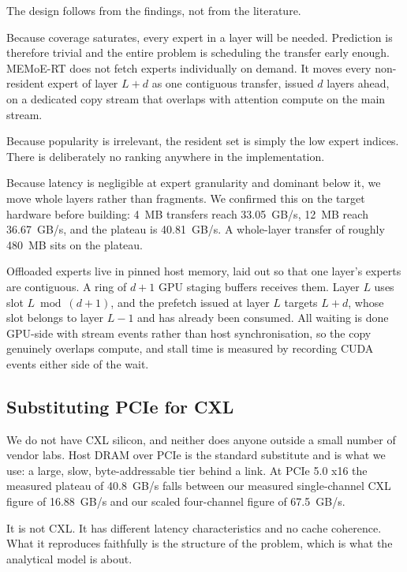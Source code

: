 \documentclass[10pt,a4paper]{article}
\begin{document}
The design follows from the findings, not from the literature.

Because coverage saturates, every expert in a layer will be needed. Prediction is
therefore trivial and the entire problem is scheduling the transfer early enough.
MEMoE-RT does not fetch experts individually on demand. It moves every
non-resident expert of layer $L+d$ as one contiguous transfer, issued $d$ layers
ahead, on a dedicated copy stream that overlaps with attention compute on the main
stream.

Because popularity is irrelevant, the resident set is simply the low expert
indices. There is deliberately no ranking anywhere in the implementation.

Because latency is negligible at expert granularity and dominant below it, we move
whole layers rather than fragments. We confirmed this on the target hardware
before building: 4~MB transfers reach 33.05~GB/s, 12~MB reach 36.67~GB/s, and the
plateau is 40.81~GB/s. A whole-layer transfer of roughly 480~MB sits on the
plateau.

Offloaded experts live in pinned host memory, laid out so that one layer's experts
are contiguous. A ring of $d+1$ GPU staging buffers receives them. Layer $L$ uses
slot $L \bmod (d+1)$, and the prefetch issued at layer $L$ targets $L+d$, whose
slot belongs to layer $L-1$ and has already been consumed. All waiting is done
GPU-side with stream events rather than host synchronisation, so the copy genuinely
overlaps compute, and stall time is measured by recording CUDA events either side
of the wait.




\subsection{Substituting PCIe for CXL}

We do not have CXL silicon, and neither does anyone outside a small number of
vendor labs. Host DRAM over PCIe is the standard substitute and is what we use: a
large, slow, byte-addressable tier behind a link. At PCIe 5.0 x16 the measured
plateau of 40.8~GB/s falls between our measured single-channel CXL figure of
16.88~GB/s and our scaled four-channel figure of 67.5~GB/s.

It is not CXL. It has different latency characteristics and no cache coherence.
What it reproduces faithfully is the structure of the problem, which is what the
analytical model is about.
\end{document}
